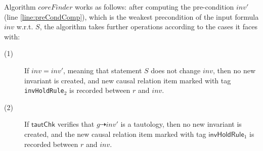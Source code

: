 \documentclass[final]{IEEEtran}
\def \eqc {=}
\def \andc {\wedge }
\begin{document}
Algorithm $coreFinder$ works as follows: after computing the pre-condition $ inv'$ (line \ref{line:preCondComp}), which is the weakest precondition of the input formula $inv$ w.r.t. $S$, the algorithm takes further operations according to the cases it faces with:

\begin{description}
\item[(1)] If $ inv=inv'$, meaning that statement $S$ does not change $inv$, then no new invariant is created, and  new causal
relation item marked with tag {\tt invHoldRule$_2$} is recorded
between $r$ and $inv$.%

\item[(2)] If $\mathsf{ tautChk}$ verifies that $g \dashrightarrow inv'$ is a tautology, then  no new invariant is created, and
the new causal relation item marked with tag
$ \mathsf{invHoldRule}_1$ is recorded between $r$ and $inv$. %



\end{description}
\end{document}
